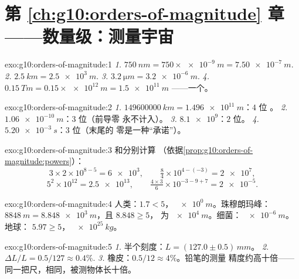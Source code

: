 \section*{第 \ref{ch:g10:orders-of-magnitude} 章——数量级：测量宇宙}

\begin{solution}{exo:g10:orders-of-magnitude:1}
\emph{1.} $\qty{750}{nm} = 750 \times \qty{e-9}{m} = \qty{7.50e-7}{m}$.
\emph{2.} $\qty{2.5}{km} = \qty{2.5e3}{m}$.
\emph{3.} $\qty{3.2}{\micro m} = \qty{3.2e-6}{m}$.
\emph{4.} $\qty{0.15}{Tm} = 0.15 \times \qty{e12}{m} = \qty{1.5e11}{m}$
——一个。
\end{solution}

\begin{solution}{exo:g10:orders-of-magnitude:2}
\emph{1.} $\qty{149600000}{km} = \qty{1.496e11}{m}$：$4$ 位
。
\emph{2.} $\qty{1.06e-10}{m}$：$3$ 位（前导零
永不计入）。
\emph{3.} $\num{8.1e9}$：$2$ 位。
\emph{4.} $\qty{5.20e-3}{s}$：$3$ 位（末尾的
零是一种“承诺”）。
\end{solution}

\begin{solution}{exo:g10:orders-of-magnitude:3}
和分别计算
（依据\cref{prop:g10:orders-of-magnitude:powers}）：
\[
3 \times 2 \times 10^{8-5} = \num{6e3}, \qquad
\tfrac{8}{4} \times 10^{4-(-3)} = \num{2e7},
\]
\[
5^{2} \times 10^{12} = \num{2.5e13}, \qquad
\tfrac{4 \times 3}{6} \times 10^{-3-9+7} = \num{2e-5} .
\]
\end{solution}

\begin{solution}{exo:g10:orders-of-magnitude:4}
人类：$1.7 < 5$， $\qty{e0}{m}$。珠穆朗玛峰：
$\qty{8848}{m} = \qty{8.848e3}{m}$，且 $8.848 \geq 5$，
为 $\qty{e4}{m}$。细菌： $\qty{e-6}{m}$。地球：
$5.97 \geq 5$， $\qty{e25}{kg}$。
\end{solution}

\begin{solution}{exo:g10:orders-of-magnitude:5}
\emph{1.} 半个刻度：$L = (127.0 \pm 0.5)\,\unit{mm}$。
\emph{2.} $\Delta L / L = 0.5/127 \approx 0.4\%$.
\emph{3.} 橡皮：$0.5/12 \approx 4\%$。铅笔的测量
精度约高十倍——同一把尺，相同，被测物体长十倍。
\end{solution}

